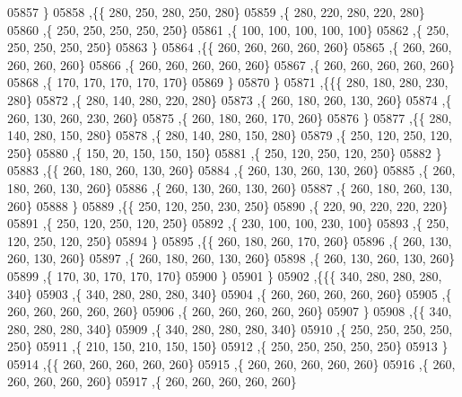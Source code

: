 \begin{DoxyCode}
05857     \}
05858    ,\{\{   280,   250,   280,   250,   280\}
05859     ,\{   280,   220,   280,   220,   280\}
05860     ,\{   250,   250,   250,   250,   250\}
05861     ,\{   100,   100,   100,   100,   100\}
05862     ,\{   250,   250,   250,   250,   250\}
05863     \}
05864    ,\{\{   260,   260,   260,   260,   260\}
05865     ,\{   260,   260,   260,   260,   260\}
05866     ,\{   260,   260,   260,   260,   260\}
05867     ,\{   260,   260,   260,   260,   260\}
05868     ,\{   170,   170,   170,   170,   170\}
05869     \}
05870    \}
05871   ,\{\{\{   280,   180,   280,   230,   280\}
05872     ,\{   280,   140,   280,   220,   280\}
05873     ,\{   260,   180,   260,   130,   260\}
05874     ,\{   260,   130,   260,   230,   260\}
05875     ,\{   260,   180,   260,   170,   260\}
05876     \}
05877    ,\{\{   280,   140,   280,   150,   280\}
05878     ,\{   280,   140,   280,   150,   280\}
05879     ,\{   250,   120,   250,   120,   250\}
05880     ,\{   150,    20,   150,   150,   150\}
05881     ,\{   250,   120,   250,   120,   250\}
05882     \}
05883    ,\{\{   260,   180,   260,   130,   260\}
05884     ,\{   260,   130,   260,   130,   260\}
05885     ,\{   260,   180,   260,   130,   260\}
05886     ,\{   260,   130,   260,   130,   260\}
05887     ,\{   260,   180,   260,   130,   260\}
05888     \}
05889    ,\{\{   250,   120,   250,   230,   250\}
05890     ,\{   220,    90,   220,   220,   220\}
05891     ,\{   250,   120,   250,   120,   250\}
05892     ,\{   230,   100,   100,   230,   100\}
05893     ,\{   250,   120,   250,   120,   250\}
05894     \}
05895    ,\{\{   260,   180,   260,   170,   260\}
05896     ,\{   260,   130,   260,   130,   260\}
05897     ,\{   260,   180,   260,   130,   260\}
05898     ,\{   260,   130,   260,   130,   260\}
05899     ,\{   170,    30,   170,   170,   170\}
05900     \}
05901    \}
05902   ,\{\{\{   340,   280,   280,   280,   340\}
05903     ,\{   340,   280,   280,   280,   340\}
05904     ,\{   260,   260,   260,   260,   260\}
05905     ,\{   260,   260,   260,   260,   260\}
05906     ,\{   260,   260,   260,   260,   260\}
05907     \}
05908    ,\{\{   340,   280,   280,   280,   340\}
05909     ,\{   340,   280,   280,   280,   340\}
05910     ,\{   250,   250,   250,   250,   250\}
05911     ,\{   210,   150,   210,   150,   150\}
05912     ,\{   250,   250,   250,   250,   250\}
05913     \}
05914    ,\{\{   260,   260,   260,   260,   260\}
05915     ,\{   260,   260,   260,   260,   260\}
05916     ,\{   260,   260,   260,   260,   260\}
05917     ,\{   260,   260,   260,   260,   260\}

\end{DoxyCode}
